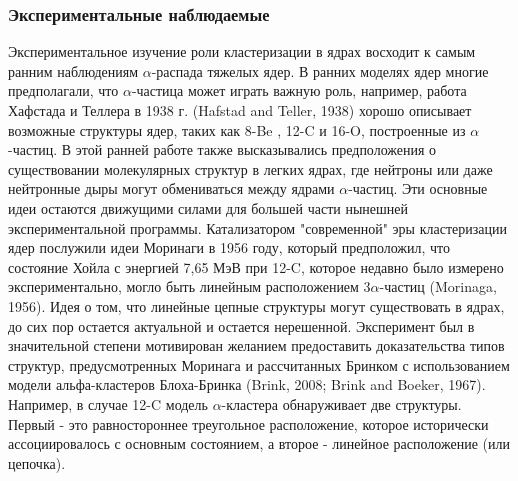 \documentclass[fontsize=14pt]{scrarticle}
\begin{document}
\subsubsection{ Экспериментальные наблюдаемые}
Экспериментальное изучение роли кластеризации в ядрах восходит к самым ранним наблюдениям $\alpha$-распада тяжелых ядер. В ранних моделях ядер многие предполагали, что $\alpha$-частица может играть важную роль, например, работа Хафстада и Теллера в 1938 г. (Hafstad and Teller, 1938) хорошо описывает возможные структуры ядер, таких как 8-Be , 12-C и 16-O, построенные из $\alpha$-частиц. В этой ранней работе также высказывались предположения о существовании молекулярных структур в легких ядрах, где нейтроны или даже нейтронные дыры могут обмениваться между ядрами $\alpha$-частиц. Эти основные идеи остаются движущими силами для большей части нынешней экспериментальной программы. Катализатором "современной" эры кластеризации ядер послужили идеи Моринаги в 1956 году, который предположил, что состояние Хойла с энергией 7,65 МэВ при 12-C, которое недавно было измерено экспериментально, могло быть линейным расположением 3$\alpha$-частиц (Morinaga, 1956). Идея о том, что линейные цепные структуры могут существовать в ядрах, до сих пор остается актуальной и остается нерешенной. Эксперимент был в значительной степени мотивирован желанием предоставить доказательства типов структур, предусмотренных Моринага и рассчитанных Бринком с использованием модели альфа-кластеров Блоха-Бринка (Brink, 2008; Brink and Boeker, 1967). Например, в случае 12-C модель $\alpha$-кластера обнаруживает две структуры. Первый - это равностороннее треугольное расположение, которое исторически ассоциировалось с основным состоянием, а второе - линейное расположение (или цепочка).
\end{document}
